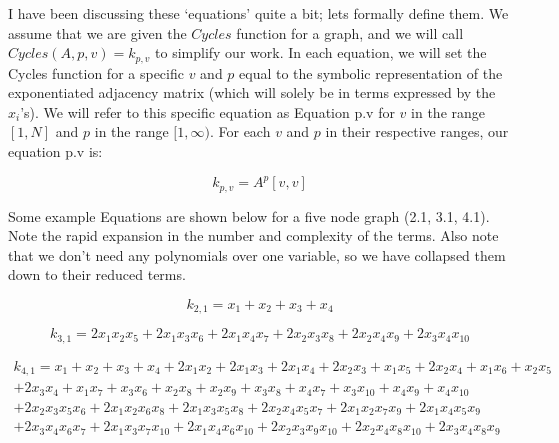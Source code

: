 I have been discussing these `equations' quite a bit; lets formally define them.  
We assume that we are given the $Cycles$ function for a graph, and we will call $Cycles(A, p, v) = k_{p, v}$ to simplify our work. 
In each equation, we will set the Cycles function for a specific $v$ and $p$ equal to the symbolic representation of the exponentiated adjacency matrix (which will solely be in terms expressed by the $x_i$'s).
We will refer to this specific equation as Equation p.v for $v$ in the range $[1, N]$ and $p$ in the range $[1, \infty)$.
For each $v$ and $p$ in their respective ranges, our equation p.v is:

$$k_{p, v} = A^p[v,v]$$

Some example Equations are shown below for a five node graph (2.1, 3.1, 4.1). 
Note the rapid expansion in the number and complexity of the terms.  
Also note that we don't need any polynomials over one variable, so we have collapsed them down to their reduced terms.

$$k_{2,1} = x_1 + x_2 + x_3 + x_4$$

$$k_{3,1} = 2x_1x_2x_5 + 2x_1x_3x_6 + 2x_1x_4x_7 + 2x_2x_3x_8 + 2x_2x_4x_9 + 2x_3x_4x_{10}$$

\begin{equation}\begin{aligned} k_{4,1} = x_1 + x_2 + x_3 + x_4 + 2x_1x_2 + 2x_1x_3 + 2x_1x_4 + 2x_2x_3 + x_1x_5 + 2x_2x_4 + x_1x_6 + x_2x_5 \\ + 2x_3x_4 + x_1x_7 + x_3x_6 + x_2x_8 + x_2x_9 + x_3x_8 + x_4x_7 + x_3x_{10} + x_4x_9 + x_4x_{10} \\ + 2x_2x_3x_5x_6 + 2x_1x_2x_6x_8 + 2x_1x_3x_5x_8 + 2x_2x_4x_5x_7 + 2x_1x_2x_7x_9 + 2x_1x_4x_5x_9 \\+ 2x_3x_4x_6x_7 + 2x_1x_3x_7x_{10} + 2x_1x_4x_6x_{10} + 2x_2x_3x_9x_{10} + 2x_2x_4x_8x_{10} + 2x_3x_4x_8x_9 \end{aligned}\end{equation}

